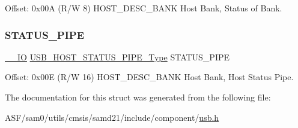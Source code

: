 Offset\+: 0x00A (R/W 8) H\+O\+S\+T\+\_\+\+D\+E\+S\+C\+\_\+\+B\+A\+NK Host Bank, Status of Bank. 

\mbox{\label{struct_usb_host_desc_bank_a38973efc056bd1ab77a7a860ba49dfe9}} 
\subsubsection{\texorpdfstring{STATUS\_PIPE}{STATUS\_PIPE}}
{\footnotesize\ttfamily \mbox{\hyperlink{core__cm0plus_8h_aec43007d9998a0a0e01faede4133d6be}{\+\_\+\+\_\+\+IO}} \mbox{\hyperlink{union_u_s_b___h_o_s_t___s_t_a_t_u_s___p_i_p_e___type}{U\+S\+B\+\_\+\+H\+O\+S\+T\+\_\+\+S\+T\+A\+T\+U\+S\+\_\+\+P\+I\+P\+E\+\_\+\+Type}} S\+T\+A\+T\+U\+S\+\_\+\+P\+I\+PE}



Offset\+: 0x00E (R/W 16) H\+O\+S\+T\+\_\+\+D\+E\+S\+C\+\_\+\+B\+A\+NK Host Bank, Host Status Pipe. 



The documentation for this struct was generated from the following file\+:\begin{DoxyCompactItemize}
\item 
A\+S\+F/sam0/utils/cmsis/samd21/include/component/\mbox{\hyperlink{component_2usb_8h}{usb.\+h}}\end{DoxyCompactItemize}
